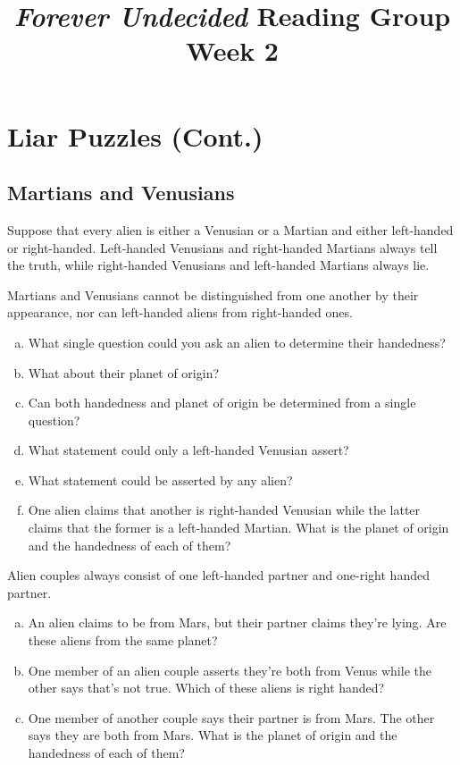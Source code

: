 \documentclass{article}
\title{\emph{Forever Undecided} Reading Group \\ Week 2}
\date{}
\author{}
\begin{document}
\maketitle

\section*{Liar Puzzles (Cont.)}

\subsection*{Martians and Venusians}
Suppose that every alien is either a Venusian or a Martian and either left-handed or right-handed. Left-handed Venusians and right-handed Martians always tell the truth, while right-handed Venusians and left-handed Martians always lie. 

\begin{prob}{1.4}
    Martians and Venusians cannot be distinguished from one another by their appearance, nor can left-handed aliens from right-handed ones.
    \begin{enumerate}[a)]
        \item What single question could you ask an alien to determine their handedness?
        \item What about their planet of origin?
        \item Can both handedness and planet of origin be determined from a single question?
        \item What statement could only a left-handed Venusian assert?
        \item What statement could be asserted by any alien?
        \item One alien claims that another is right-handed Venusian while the latter claims that the former is a left-handed Martian. What is the planet of origin and the handedness of each of them?
    \end{enumerate}
\end{prob}

\begin{prob}{1.5}
    Alien couples always consist of one left-handed partner and one-right handed partner.
    \begin{enumerate}[a)]
        \item An alien claims to be from Mars, but their partner claims they're lying. Are these aliens from the same planet?
        \item One member of an alien couple asserts they're both from Venus while the other says that's not true. Which of these aliens is right handed?
        \item One member of another couple says their partner is from Mars. The other says they are both from Mars. What is the planet of origin and the handedness of each of them?
    \end{enumerate}
\end{prob}
\end{document}
